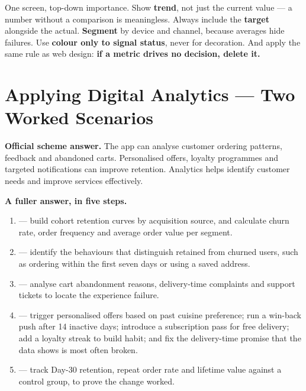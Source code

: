 \begin{keybox}
One screen, top-down importance. Show \textbf{trend}, not just the current value
--- a number without a comparison is meaningless. Always include the
\textbf{target} alongside the actual. \textbf{Segment} by device and channel,
because averages hide failures. Use \textbf{colour only to signal status}, never
for decoration. And apply the same rule as web design: \textbf{if a metric drives
no decision, delete it.}
\end{keybox}

\section{Applying Digital Analytics --- Two Worked Scenarios}

\begin{exambox}
\textbf{Official scheme answer.} The app can analyse customer ordering patterns,
feedback and abandoned carts. Personalised offers, loyalty programmes and targeted
notifications can improve retention. Analytics helps identify customer needs and
improve services effectively.

\smallskip
\textbf{A fuller answer, in five steps.}
\begin{enumerate}
\item {} --- build cohort retention curves by acquisition source, and
      calculate churn rate, order frequency and average order value per segment.
\item {} --- identify the behaviours that distinguish retained from
      churned users, such as ordering within the first seven days or using a saved
      address.
\item {} --- analyse cart abandonment reasons, delivery-time
      complaints and support tickets to locate the experience failure.
\item {} --- trigger personalised offers based on past cuisine preference;
      run a win-back push after 14 inactive days; introduce a subscription pass for
      free delivery; add a loyalty streak to build habit; and fix the delivery-time
      promise that the data shows is most often broken.
\item {} --- track Day-30 retention, repeat order rate and
      lifetime value against a control group, to prove the change worked.
\end{enumerate}
\end{exambox}

